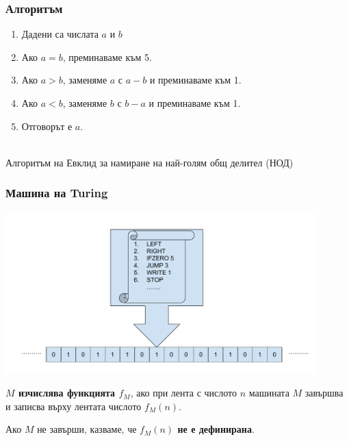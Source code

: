 \documentclass{beamer}
\begin{document}
\begin{frame}
  \frametitle{Алгоритъм}
  \begin{enumerate}
  \item Дадени са числата $a$ и $b$
  \item Ако $a = b$, преминаваме към 5.
  \item Ако $a > b$, заменяме $a$ с $a - b$ и преминаваме към 1.
  \item Ако $a < b$, заменяме $b$ с $b - a$ и преминаваме към 1.
  \item Отговорът е $a$.
  \end{enumerate}
  \pause\ \\[2em]
  Алгоритъм на Евклид за намиране на най-голям общ делител (НОД)
\end{frame}

\begin{frame}
  \frametitle{Машина на Turing}

  \includegraphics[width=0.9\textwidth]{images/turing.pdf}

  \pause
  \textbf{$M$ изчислява функцията $f_M$}, ако при лента с числото $n$ машината $M$ завършва и записва върху лентата числото $f_M(n)$.

  \pause
  Ако $M$ не завърши, казваме, че \textbf{$f_M(n)$ не е дефинирана}.
\end{frame}
\end{document}
